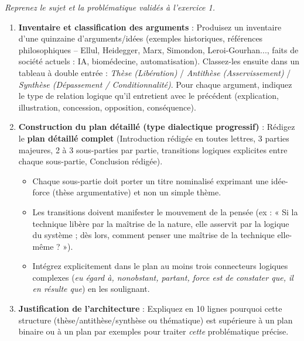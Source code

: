 \documentclass[11pt]{article}
\begin{document}
\begin{exercice}
\emph{Reprenez le sujet et la problématique validés à l'exercice 1.}

\begin{enumerate}
    \item \textbf{Inventaire et classification des arguments} : Produisez un inventaire d'une quinzaine d'arguments/idées (exemples historiques, références philosophiques -- Ellul, Heidegger, Marx, Simondon, Leroi-Gourhan..., faits de société actuels : IA, biomédecine, automatisation). Classez-les ensuite dans un tableau à double entrée : \textit{Thèse (Libération)} / \textit{Antithèse (Asservissement)} / \textit{Synthèse (Dépassement / Conditionnalité)}. Pour chaque argument, indiquez le type de relation logique qu'il entretient avec le précédent (explication, illustration, concession, opposition, conséquence).
    \item \textbf{Construction du plan détaillé (type dialectique progressif)} : Rédigez le \textbf{plan détaillé complet} (Introduction rédigée en toutes lettres, 3 parties majeures, 2 à 3 sous-parties par partie, transitions logiques explicites entre chaque sous-partie, Conclusion rédigée). 
    \begin{itemize}
        \item Chaque sous-partie doit porter un titre nominalisé exprimant une idée-force (thèse argumentative) et non un simple thème.
        \item Les transitions doivent manifester le mouvement de la pensée (ex : « Si la technique libère par la maîtrise de la nature, elle asservit par la logique du système ; dès lors, comment penser une maîtrise de la technique elle-même ? »).
        \item Intégrez explicitement dans le plan au moins trois connecteurs logiques complexes (\textit{eu égard à, nonobstant, partant, force est de constater que, il en résulte que}) en les soulignant.
    \end{itemize}
    \item \textbf{Justification de l'architecture} : Expliquez en 10 lignes pourquoi cette structure (thèse/antithèse/synthèse ou thématique) est supérieure à un plan binaire ou à un plan par exemples pour traiter \textit{cette} problématique précise.
\end{enumerate}
\end{exercice}
\end{document}
